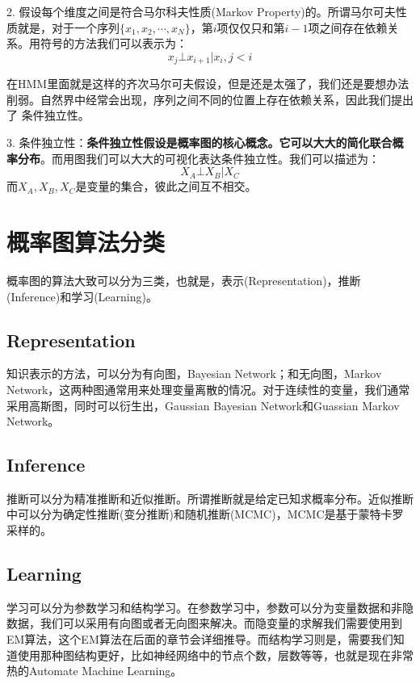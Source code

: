 \documentclass[a4paper]{article}
\begin{document}
2. 假设每个维度之间是符合马尔科夫性质(Markov Property)的。所谓马尔可夫性质就是，对于一个序列$\{ x_1,x_2,\cdots,x_N \}$，第$i$项仅仅只和第$i-1$项之间存在依赖关系。用符号的方法我们可以表示为：
\begin{equation}
    x_j\bot x_{i+1}| x_i, j<i
\end{equation}

在HMM里面就是这样的齐次马尔可夫假设，但是还是太强了，我们还是要想办法削弱。自然界中经常会出现，序列之间不同的位置上存在依赖关系，因此我们提出了{\color{red} 条件独立性}。

3. 条件独立性：\textbf{条件独立性假设是概率图的核心概念。它可以大大的简化联合概率分布}。而用图我们可以大大的可视化表达条件独立性。我们可以描述为：
\begin{equation}
    X_A \bot X_B |X_C
\end{equation}
而$X_A,X_B,X_C$是变量的集合，彼此之间互不相交。

\section{概率图算法分类}
概率图的算法大致可以分为三类，也就是，表示(Representation)，推断(Inference)和学习(Learning)。
\subsection{Representation}
知识表示的方法，可以分为有向图，Bayesian Network；和无向图，Markov Network，这两种图通常用来处理变量离散的情况。对于连续性的变量，我们通常采用高斯图，同时可以衍生出，Gaussian Bayesian Network和Guassian Markov Network。

\subsection{Inference}
推断可以分为精准推断和近似推断。所谓推断就是给定已知求概率分布。近似推断中可以分为确定性推断(变分推断)和随机推断(MCMC)，MCMC是基于蒙特卡罗采样的。

\subsection{Learning}
学习可以分为参数学习和结构学习。在参数学习中，参数可以分为变量数据和非隐数据，我们可以采用有向图或者无向图来解决。而隐变量的求解我们需要使用到EM算法，这个EM算法在后面的章节会详细推导。而结构学习则是，需要我们知道使用那种图结构更好，比如神经网络中的节点个数，层数等等，也就是现在非常热的Automate Machine Learning。




















 
\end{document}
